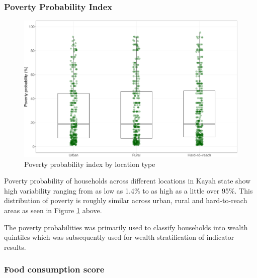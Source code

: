 \documentclass[12pt,a4paper]{article}
\begin{document}
\hypertarget{ppi-results}{%
\subsubsection{Poverty Probability Index}\label{ppi-results}}

\begin{figure}[H]

{\centering \includegraphics{kayahReport_files/figure-latex/ppiTable-1} 

}

\caption{Poverty probability index by location type}\label{fig:ppiTable}
\end{figure}

Poverty probability of households across different locations in Kayah state show high variability ranging from as low as 1.4\% to as high as a little over 95\%. This distribution of poverty is roughly similar across urban, rural and hard-to-reach areas as seen in Figure \ref{fig:ppiTable} above.

The poverty probabilities was primarily used to classify households into wealth quintiles which was subsequently used for wealth stratification of indicator results.

\hypertarget{fcs-results}{%
\subsubsection{Food consumption score}\label{fcs-results}}
\end{document}
